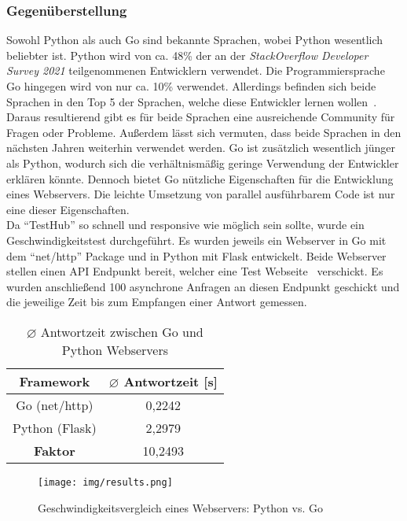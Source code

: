 \subsubsection{Gegenüberstellung}
Sowohl Python als auch Go sind bekannte Sprachen, wobei Python wesentlich 
beliebter ist. Python wird von ca. 48\% der an der \textit{StackOverflow 
Developer Survey 2021} teilgenommenen Entwicklern verwendet. Die Programmiersprache Go hingegen wird von nur ca. 
10\% verwendet. Allerdings befinden sich beide Sprachen in den Top 5 der Sprachen, welche diese Entwickler
lernen wollen~\cite{Sta21}. Daraus resultierend gibt es für beide Sprachen eine ausreichende
Community für Fragen oder Probleme. Außerdem lässt sich vermuten, dass beide Sprachen
in den nächsten Jahren weiterhin verwendet werden. Go ist zusätzlich wesentlich jünger als
Python, wodurch sich die verhältnismäßig geringe Verwendung der Entwickler erklären könnte.
Dennoch bietet Go nützliche Eigenschaften für die Entwicklung eines Webservers.
Die leichte Umsetzung von parallel ausführbarem Code ist nur eine dieser Eigenschaften.\\

Da ``TestHub'' so schnell und responsive wie möglich sein sollte, wurde ein 
Geschwindigkeitstest durchgeführt. Es wurden jeweils ein Webserver in Go mit 
dem ``net/http'' Package und in Python mit Flask entwickelt. Beide Webserver stellen
einen \gls{API} Endpunkt bereit, welcher eine Test Webseite~\cite{Bra22} verschickt.
Es wurden anschließend 100 asynchrone Anfragen an diesen Endpunkt geschickt und die jeweilige
Zeit bis zum Empfangen einer Antwort gemessen.

\begin{table}[H]
    \centering
    \begin{tabular}{|c | c|} 
     \hline
     \textbf{Framework} & \textbf{$\diameter$ Antwortzeit [s]} \\ [0.5ex] 
     \hline
     Go (net/http) & 0,2242 \\ [0.5ex]
     \hline
     Python (Flask) & 2,2979 \\ [0.5ex] 
     \hline
     \textbf{Faktor} & 10,2493 \\ [1ex] 
     \hline
    \end{tabular}
    \caption{$\diameter$ Antwortzeit zwischen Go und Python Webservers}
    \label{table:1}
\end{table}

\begin{figure}[H]
    \texttt{[image: img/results.png]}
    \caption{Geschwindigkeitsvergleich eines Webservers: Python vs. Go}\label{fig:speedtestresults}
\end{figure}

